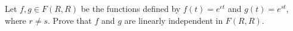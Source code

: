 Let $f,g \in F(R,R)$ be the functions defined by $f(t) = e^{et}$ and $g(t) = e^{st}$, where $r \neq s$. Prove that $f$ and $g$ are linearly independent in $F(R,R)$.

\begin{tcolorbox}
	\begin{solution}
		
	\end{solution}
\end{tcolorbox}